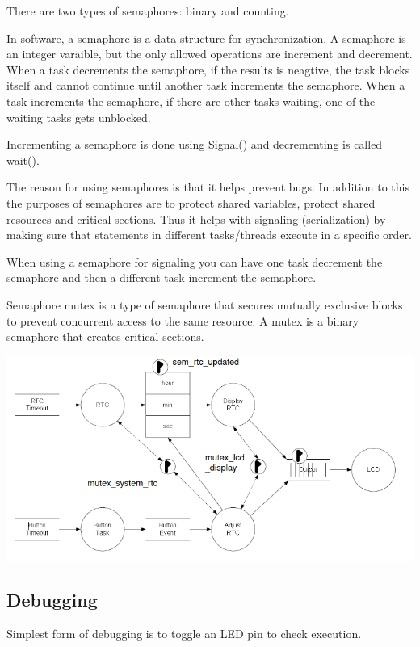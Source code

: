 There are two types of semaphores: binary and counting.

In software, a semaphore is a data structure for synchronization.
A semaphore is an integer varaible, but the only allowed operations
are increment and decrement. When a task decrements the
semaphore, if the results is neagtive,
the task blocks itself and cannot continue until
another task increments the semaphore.
When a task increments the semaphore, if there are other tasks waiting,
one of the waiting tasks gets unblocked.

Incrementing a semaphore is done using Signal() and decrementing
is called wait().

The reason for using semaphores is that it helps prevent bugs.
In addition to this the purposes of semaphores are to protect shared
variables, protect shared resources and critical sections.
Thus it helps with signaling (serialization)
by making sure that statements in different tasks/threads execute
in a specific order.

When using a semaphore for signaling you can have one task decrement the semaphore
and then a different task increment the semaphore.

Semaphore mutex is a type of semaphore that secures mutually exclusive
blocks to prevent concurrent access to the same resource.
A mutex is a binary semaphore that creates critical sections.

\begin{center}
	\includegraphics[width=\textwidth]{images/taskSemaphore.png}
\end{center}


\subsection{Debugging}
Simplest form of debugging is to toggle an LED pin to check execution.

